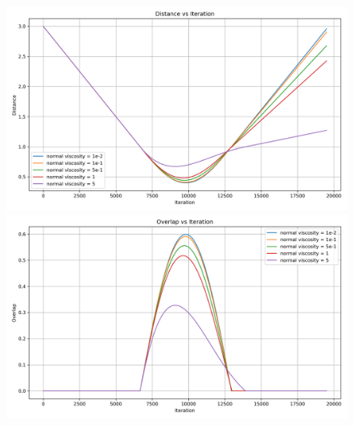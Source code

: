 \documentclass[11pt,
               a4paper,
               bibtotoc,
               idxtotoc,
               headsepline,
               footsepline,
               footexclude,
               BCOR12mm,
               DIV13,
               openany,   %
               ]
               {scrbook}
\begin{document}
\begin{figure}[H]
	\centering
	\begin{minipage}[t]{0.65\textwidth}
		\centering
		\includegraphics[width=\textwidth]{figures/contactForceLaws/linearNormalContactModel/Distance vs Iterationsimple_collision_two_particles_statistics_stiffness_50_viscosity_1e-2.png}
	\end{minipage}
	
		\vspace{0.5cm} %
		
	\begin{minipage}[t]{0.65\textwidth}
		\centering
		\includegraphics[width=\textwidth]{figures/contactForceLaws/linearNormalContactModel/Overlap vs Iterationsimple_collision_two_particles_statistics_stiffness_50_viscosity_1e-2.png}
	\end{minipage}
	
	\vspace{0.5cm} %
	

\end{figure}
\end{document}

